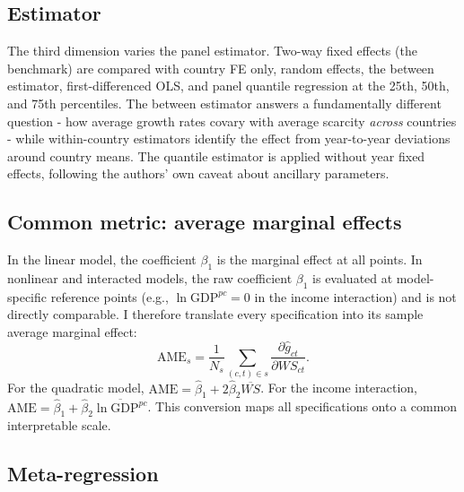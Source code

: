 \documentclass[12pt]{article}
\begin{document}
\subsection*{Estimator}

The third dimension varies the panel estimator. Two-way fixed effects (the benchmark) are compared with country FE only, random effects, the between estimator, first-differenced OLS, and \citet{machado_santos_silva_2019} panel quantile regression at the 25th, 50th, and 75th percentiles. The between estimator answers a fundamentally different question - how average growth rates covary with average scarcity \emph{across} countries - while within-country estimators identify the effect from year-to-year deviations around country means. The quantile estimator is applied without year fixed effects, following the authors' own caveat about ancillary parameters.

\subsection*{Common metric: average marginal effects}

In the linear model, the coefficient $\beta_1$ is the marginal effect at all points. In nonlinear and interacted models, the raw coefficient $\beta_1$ is evaluated at model-specific reference points (e.g., $\ln \text{GDP}^{pc} = 0$ in the income interaction) and is not directly comparable. I therefore translate every specification into its sample average marginal effect:
\begin{equation}
\text{AME}_s = \frac{1}{N_s} \sum_{(c,t) \in s} \frac{\partial \hat{g}_{ct}}{\partial WS_{ct}}.
\label{eq:ame}
\end{equation}
For the quadratic model, $\text{AME} = \hat{\beta}_1 + 2\hat{\beta}_2 \overline{WS}$. For the income interaction, $\text{AME} = \hat{\beta}_1 + \hat{\beta}_2 \overline{\ln \text{GDP}^{pc}}$. This conversion maps all specifications onto a common interpretable scale.

\subsection*{Meta-regression}
\end{document}
